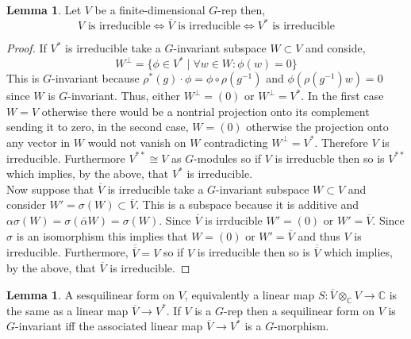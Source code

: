 \documentclass[12pt]{extarticle}
\theoremstyle{definition}
\newtheorem{lemma}[theorem]{Lemma}
\newcommand{\C}{\mathbb{C}}
\begin{document}
\begin{lemma}
Let $V$ be a finite-dimensional $G$-rep then,
\[ V \text{ is irreducible} \iff \overline{V} \text{ is irreducible} \iff V^* \text{ is irreducible} \]
\end{lemma}

\begin{proof}
If $V^*$ is irreducible take a $G$-invariant subspace $W \subset V$ and conside,
\[ W^\perp = \{ \phi \in V^* \mid \forall w \in W : \phi(w) = 0 \} \]
This is $G$-invariant because $\rho^*(g) \cdot \phi = \phi \circ \rho(g^{-1})$ and $\phi(\rho(g^{-1}) w) = 0$ since $W$ is $G$-invariant. Thus, either $W^\perp = (0)$ or $W^\perp = V^*$. In the first case $W = V$ otherwise there would be a nontrial projection onto its complement sending it to zero, in the second case, $W = (0)$ otherwise the projection onto any vector in $W$ would not vanish on $W$ contradicting $W^\perp = V^*$. Therefore $V$ is irreducible. Furthermore $V^{**} \cong V$ as $G$-modules so if $V$ is irreducble then so is $V^{**}$ which implies, by the above, that $V^*$ is irreducible. 
\bigskip\\
Now suppose that $\overline{V}$ is irreducible take a $G$-invariant subspace $W \subset V$ and consider $W' = \sigma(W) \subset \overline{V}$. This is a subspace because it is additive and $\alpha \sigma(W) = \sigma(\bar{\alpha} W) = \sigma(W)$. Since $\overline{V}$ is irrducible $W' = (0)$ or $W' = \overline{V}$. Since $\sigma$ is an isomorphism this implies that $W = (0)$ or $W' = \overline{V}$ and thus $V$ is irreducible. Furthermore, $\overline{\overline{V}} = V$ so if $V$ is irreducible then so is $\overline{\overline{V}}$ which implies, by the above, that $\overline{V}$ is irreducible. 
\end{proof}

\begin{lemma}
A sesquilinear form on $V$, equivalently a linear map $S : \overline{V} \otimes_\C V \to \C$ is the same as a linear map $\overline{V} \to V^*$. If $V$ is a $G$-rep then a sequilinear form on $V$ is $G$-invariant iff the associated linear map $\overline{V} \to V^*$ is a $G$-morphism. 
\end{lemma}
\end{document}

